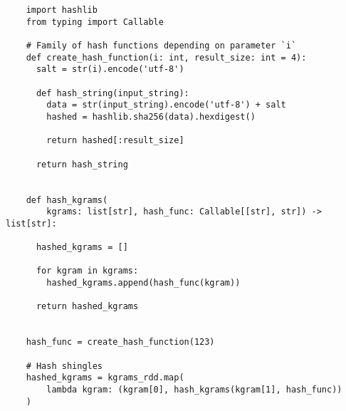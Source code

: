 \documentclass{article}
\begin{document}
  \begin{verbatim}
    import hashlib
    from typing import Callable

    # Family of hash functions depending on parameter `i`
    def create_hash_function(i: int, result_size: int = 4):
      salt = str(i).encode('utf-8')

      def hash_string(input_string):
        data = str(input_string).encode('utf-8') + salt
        hashed = hashlib.sha256(data).hexdigest()

        return hashed[:result_size]

      return hash_string


    def hash_kgrams(
        kgrams: list[str], hash_func: Callable[[str], str]) -> list[str]:

      hashed_kgrams = []

      for kgram in kgrams:
        hashed_kgrams.append(hash_func(kgram))

      return hashed_kgrams


    hash_func = create_hash_function(123)

    # Hash shingles
    hashed_kgrams = kgrams_rdd.map(
        lambda kgram: (kgram[0], hash_kgrams(kgram[1], hash_func))
    )
  \end{verbatim}

  \newpage
\end{document}

